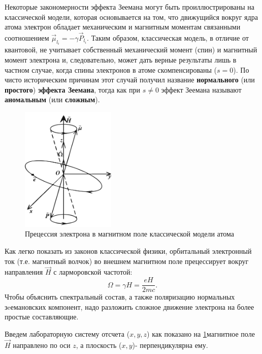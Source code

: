 Некоторые закономерности эффекта Зеемана могут быть проиллюстрированы на классической модели, которая основывается на том, что движущийся вокруг ядра атома электрон обладает механическим и магнитным моментам связанными соотношением $\vec{\mu}_{l_i}=-\gamma \vec{P}_{l_i}$. Таким образом, классическая модель, в отличие от квантовой, не учитывает собственный механический момент (спин) и магнитный момент электрона и, следовательно, может дать верные результаты лишь в частном случае, когда спины электронов в атоме скомпенсированы ($s=0$). По чисто историческим причинам этот случай получил название \textbf{нормального} (или \textbf{простого}) \textbf{эффекта Зеемана}, тогда как при \textbf{$s\ne0$} эффект Зеемана называют \textbf{аномальным} (или \textbf{сложным}). 

\begin{figure}
\begin{center}
\vspace{-50pt}
\includegraphics[width=0.4\textwidth]{fig/fig4.jpg}
\vspace{-45pt}
\end{center}
\caption{Прецессия электрона в магнитном поле классической модели атома}
\label{fig:4}
\end{figure}

Как легко показать из законов классической физики, орбитальный электронный ток (т.е. магнитный волчок) во внешнем магнитном поле прецессирует вокруг направления $\vec{H}$ с ларморовской частотой: 
\begin{equation}
	\Omega=\gamma H=\frac{eH}{2mc}.
\end{equation} 
Чтобы объяснить спектральный состав, а также поляризацию нормальных зeемановских компонент, надо разложить сложное движение электрона на более простые составляющие.

Введем лабораторную систему отсчета ($x, y, z$) как показано на \ref{fig:4}магнитное поле $\vec{H}$ направлено по оси $z$, а плоскость ($x, y$)- перпендикулярна ему. 

